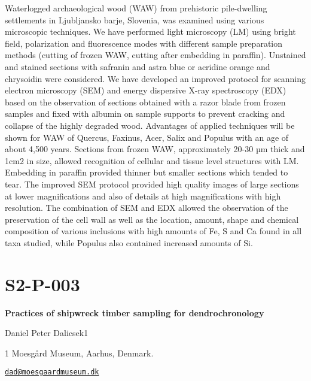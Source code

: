\documentclass[
]{book}
\begin{document}
Waterlogged archaeological wood (WAW) from prehistoric pile-dwelling settlements in Ljubljansko barje, Slovenia, was examined using various microscopic techniques. We have performed light microscopy (LM) using bright field, polarization and fluorescence modes with different sample preparation methods (cutting of frozen WAW, cutting after embedding in paraffin). Unstained and stained sections with safranin and astra blue or acridine orange and chrysoidin were considered. We have developed an improved protocol for scanning electron microscopy (SEM) and energy dispersive X-ray spectroscopy (EDX) based on the observation of sections obtained with a razor blade from frozen samples and fixed with albumin on sample supports to prevent cracking and collapse of the highly degraded wood. Advantages of applied techniques will be shown for WAW of Quercus, Faxinus, Acer, Salix and Populus with an age of about 4,500 years. Sections from frozen WAW, approximately 20-30 µm thick and 1cm2 in size, allowed recognition of cellular and tissue level structures with LM. Embedding in paraffin provided thinner but smaller sections which tended to tear. The improved SEM protocol provided high quality images of large sections at lower magnifications and also of details at high magnifications with high resolution. The combination of SEM and EDX allowed the observation of the preservation of the cell wall as well as the location, amount, shape and chemical composition of various inclusions with high amounts of Fe, S and Ca found in all taxa studied, while Populus also contained increased amounts of Si.

\hypertarget{s2-p-003}{%
\section*{S2-P-003}\label{s2-p-003}}

\textbf{Practices of shipwreck timber sampling for dendrochronology}

Daniel Peter Dalicsek1

1 Moesgård Museum, Aarhus, Denmark.

\href{mailto:dad@moesgaardmuseum.dk}{\nolinkurl{dad@moesgaardmuseum.dk}}
\end{document}
